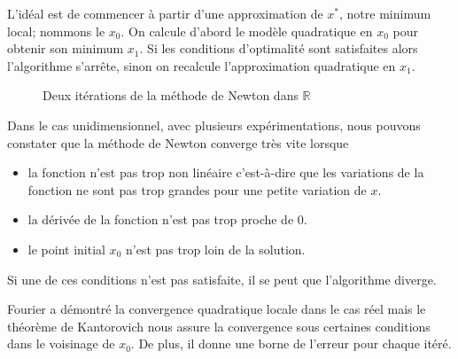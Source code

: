 % 
% 
% 
% 
%
L'id\'eal est de commencer \`a partir d'une approximation de $x^*$, notre minimum local; nommons le $x_0$. 
On calcule d'abord le mod\`ele quadratique en $x_0$ pour obtenir son minimum $x_1$. 
Si les conditions d'optimalit\'e sont satisfaites alors l'algorithme s'arrête, sinon on recalcule l'approximation
quadratique en $x_1$.

\begin{figure}
\caption{Deux it\'erations de la m\'ethode de Newton dans $\mathbb{R}$}
\begin{center}
\end{center}
\label{fig:Newton}
\end{figure}
%
Dans le cas unidimensionnel, avec plusieurs exp\'erimentations, nous pouvons constater que 
la m\'ethode de Newton converge tr\`es vite lorsque
\begin{itemize}
\item la fonction n'est pas trop non lin\'eaire c'est-\`a-dire que les variations de la fonction ne sont pas trop grandes
pour une petite variation de $x$.
\item la d\'eriv\'ee de la fonction n'est pas trop proche de $0$.
\item le point initial $x_0$ n'est pas trop loin de la solution.
\end{itemize}
Si une de ces conditions n'est pas satisfaite, il se peut que l'algorithme diverge.





Fourier \cite{convnewton} a d\'emontr\'e la convergence quadratique locale dans le cas r\'eel mais 
le th\'eor\`eme de Kantorovich nous assure la convergence sous certaines conditions dans le 
voisinage de $x_0$. De plus, il donne une borne de l'erreur pour chaque it\'er\'e.

